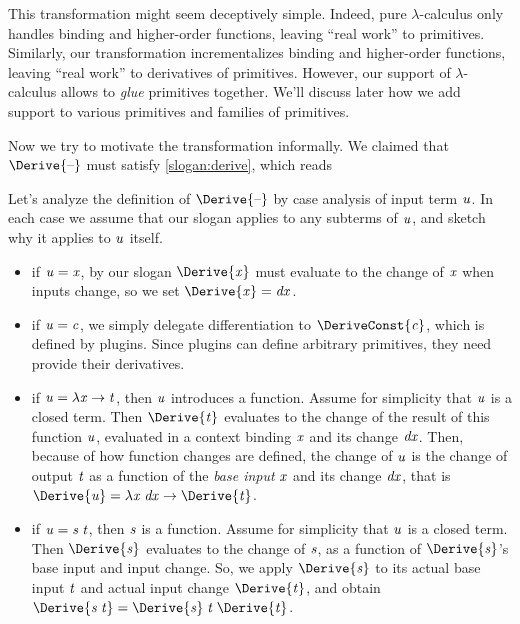 This transformation might seem deceptively simple. Indeed, pure
$\lambda$-calculus only handles binding and higher-order
functions, leaving ``real work'' to primitives. Similarly, our
transformation incrementalizes binding and higher-order
functions, leaving ``real work'' to derivatives of primitives.
However, our support of $\lambda$-calculus allows to \emph{glue}
primitives together. We'll discuss later how we add support to
various primitives and families of primitives.

Now we try to motivate the transformation informally. We claimed
that \ensuremath{\Derive{\text{\textendash}}} must satisfy \cref{slogan:derive}, which reads
%
\sloganDerive*

Let's analyze the definition of \ensuremath{\Derive{\text{\textendash}}} by case analysis
of input term \ensuremath{\Varid{u}}. In each case we assume that our slogan applies
to any subterms of \ensuremath{\Varid{u}}, and sketch why it applies to \ensuremath{\Varid{u}} itself.
\begin{itemize}
\item if \ensuremath{\Varid{u}\mathrel{=}\Varid{x}}, by our slogan \ensuremath{\Derive{\Varid{x}}} must evaluate to the
  change of \ensuremath{\Varid{x}} when inputs change, so we set \ensuremath{\Derive{\Varid{x}}\mathrel{=}\Varid{dx}}.
\item if \ensuremath{\Varid{u}\mathrel{=}\Varid{c}}, we simply delegate differentiation to
  \ensuremath{\DeriveConst{\Varid{c}}}, which is defined by plugins. Since plugins
  can define arbitrary primitives, they need provide their
  derivatives.
\item if \ensuremath{\Varid{u}\mathrel{=}\lambda \Varid{x}\to \Varid{t}}, then \ensuremath{\Varid{u}} introduces a function. Assume for
  simplicity that \ensuremath{\Varid{u}} is a closed term. Then \ensuremath{\Derive{\Varid{t}}}
  evaluates to the change of the result of this function \ensuremath{\Varid{u}},
  evaluated in a context binding \ensuremath{\Varid{x}} and its change \ensuremath{\Varid{dx}}. Then,
  because of how function changes are defined, the change of \ensuremath{\Varid{u}}
  is the change of output \ensuremath{\Varid{t}} as a function of the
  \emph{base input} \ensuremath{\Varid{x}} and its change \ensuremath{\Varid{dx}}, that is \ensuremath{\Derive{\Varid{u}}\mathrel{=}\lambda \Varid{x}\;\Varid{dx}\to \Derive{\Varid{t}}}.
\item if \ensuremath{\Varid{u}\mathrel{=}\Varid{s}\;\Varid{t}}, then \ensuremath{\Varid{s}} is a function. Assume for
  simplicity that \ensuremath{\Varid{u}} is a closed term. Then \ensuremath{\Derive{\Varid{s}}}
  evaluates to the change of \ensuremath{\Varid{s}}, as a function of \ensuremath{\Derive{\Varid{s}}}'s
  base input and input change. So, we apply \ensuremath{\Derive{\Varid{s}}} to its
  actual base input \ensuremath{\Varid{t}} and actual input change \ensuremath{\Derive{\Varid{t}}}, and
  obtain \ensuremath{\Derive{\Varid{s}\;\Varid{t}}\mathrel{=}\Derive{\Varid{s}}\;\Varid{t}\;\Derive{\Varid{t}}}.
\end{itemize}

